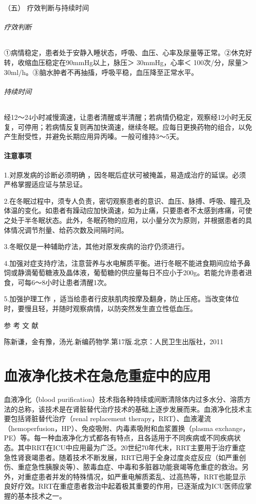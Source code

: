 \hypertarget{text00388.htmlux5cux23CHP16-9-2-5}{}
（五） 疗效判断与持续时间

\subparagraph{疗效判断}

①病情稳定，患者处于安静入睡状态，呼吸、血压、心率及尿量等正常。②休克好转，收缩血压稳定在90mmHg以上，脉压＞
30mmHg，心率＜ 100次/分，尿量＞
30ml/h。③脑水肿者不再抽搐，呼吸平稳，血压降至正常水平。

\subparagraph{持续时间}

经12～24小时减慢滴速，让患者清醒或半清醒；若病情仍稳定，观察经12小时无反复，可停用；若病情反复则再加快滴速，继续冬眠。应每日更换药物的组合，以免产生耐受性，并避免长期应用异丙嗪。一般可维持3～5天。

\subsubsection{注意事项}

1.对原发病的诊断必须明确
，因冬眠后症状可被掩盖，易造成治疗的延误。必须严格掌握适应证与禁忌证。

2.在冬眠过程中，须专人负责，密切观察患者的意识、血压、脉搏、呼吸、瞳孔及体温的变化。如患者有躁动应加快滴速，如为止痛，只要患者不太感到疼痛，可使之处于半冬眠状态。此外，冬眠药物的应用，以小量分次为原则，并根据患者的具体情况调节剂量、给药次数及间隔时间。

3.冬眠仅是一种辅助疗法，其他对原发疾病的治疗仍须进行。

4.加强对症支持疗法，注意营养与水电解质平衡。进行冬眠不能进食期间应给予鼻饲或静滴葡萄糖液及晶体液，葡萄糖的供应量每日不应小于200g。若能允许患者进食，可每6～8小时让患者清醒1次。

5.加强护理工作
，适当给患者行皮肤肌肉按摩及翻身，防止压疮。当改变体位时，要慢且轻，并随时观察病情，以防突然发生直立性低血压。

\protect\hypertarget{text00389.html}{}{}

\hypertarget{text00389.htmlux5cux23CHP16-9-4}{}
参 考 文 献

陈新谦，金有豫，汤光.新编药物学.第17版.北京：人民卫生出版社，2011

\protect\hypertarget{text00390.html}{}{}

\chapter{血液净化技术在急危重症中的应用}

血液净化（blood
purification）技术指各种持续或间断清除体内过多水分、溶质方法的总称，该技术是在肾脏替代治疗技术的基础上逐步发展而来。血液净化技术主要包括肾脏替代治疗（renal
replacement
therapy，RRT）、血液灌流（hemoperfusion，HP）、免疫吸附、内毒素吸附和血浆置换（plasma
exchange，PE）等。每一种血液净化方式都各有特点，且各适用于不同疾病或不同疾病状态。其中RRT在ICU中应用最为广泛。20世纪70年代末，RRT主要用于治疗重症急性肾衰竭患者。随着技术不断发展，RRT已用于全身过度炎症反应（如严重创伤、重症急性胰腺炎等）、脓毒血症、中毒和多脏器功能衰竭等危重症的救治。另外，对重症患者并发的特殊情况，如严重电解质紊乱、过高热等，RRT也能显示良好疗效。RRT在重症患者救治中起着极其重要的作用，已逐渐成为ICU医师应掌握的基本技术之一。

